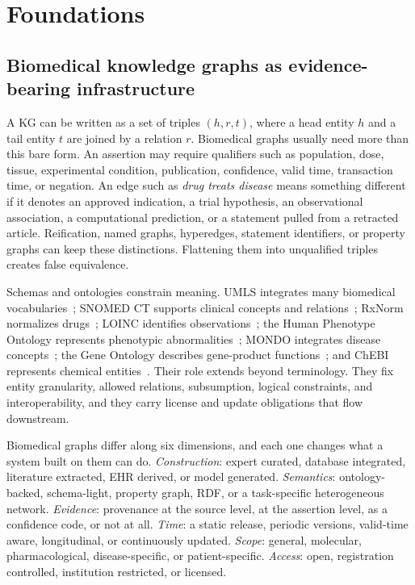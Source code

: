 \section{Foundations}
\label{sec:foundations}


\subsection{Biomedical knowledge graphs as evidence-bearing infrastructure}

A KG can be written as a set of triples $(h, r, t)$, where a head entity $h$ and a tail entity $t$ are joined by a relation $r$. Biomedical graphs usually need more than this bare form. An assertion may require qualifiers such as population, dose, tissue, experimental condition, publication, confidence, valid time, transaction time, or negation. An edge such as \emph{drug treats disease} means something different if it denotes an approved indication, a trial hypothesis, an observational association, a computational prediction, or a statement pulled from a retracted article. Reification, named graphs, hyperedges, statement identifiers, or property graphs can keep these distinctions. Flattening them into unqualified triples creates false equivalence.

Schemas and ontologies constrain meaning. UMLS integrates many biomedical vocabularies~\cite{umls}; SNOMED CT supports clinical concepts and relations~\cite{snomedct}; RxNorm normalizes drugs~\cite{rxnorm}; LOINC identifies observations~\cite{loinc}; the Human Phenotype Ontology represents phenotypic abnormalities~\cite{hpo}; MONDO integrates disease concepts~\cite{mondo}; the Gene Ontology describes gene-product functions~\cite{geneontology}; and ChEBI represents chemical entities~\cite{chebi}. Their role extends beyond terminology. They fix entity granularity, allowed relations, subsumption, logical constraints, and interoperability, and they carry license and update obligations that flow downstream.

Biomedical graphs differ along six dimensions, and each one changes what a system built on them can do. \emph{Construction}: expert curated, database integrated, literature extracted, EHR derived, or model generated. \emph{Semantics}: ontology-backed, schema-light, property graph, RDF, or a task-specific heterogeneous network. \emph{Evidence}: provenance at the source level, at the assertion level, as a confidence code, or not at all. \emph{Time}: a static release, periodic versions, valid-time aware, longitudinal, or continuously updated. \emph{Scope}: general, molecular, pharmacological, disease-specific, or patient-specific. \emph{Access}: open, registration controlled, institution restricted, or licensed.

